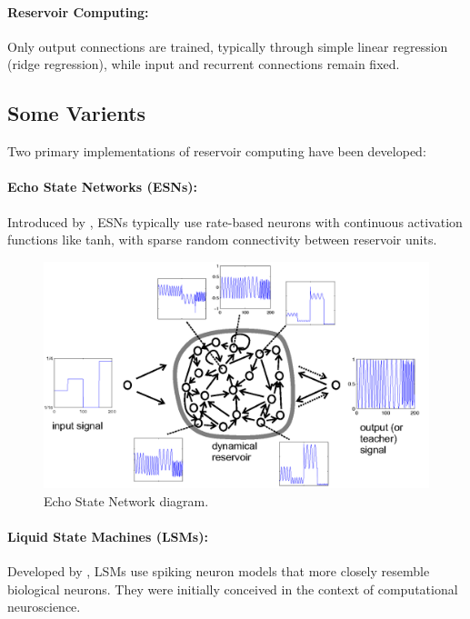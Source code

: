 \documentclass[numbered]{ivt-style/standard}
\begin{document}
\paragraph{Reservoir Computing:} Only output connections are trained, typically through simple linear regression (ridge regression), while input and recurrent connections remain fixed.

\subsection{Some Varients}

Two primary implementations of reservoir computing have been developed:

\paragraph{Echo State Networks (ESNs):} Introduced by \cite{article_esn_intro}, ESNs typically use rate-based neurons with continuous activation functions like tanh, with sparse random connectivity between reservoir units. 

\begin{figure}[H]
    \centering
    \includegraphics[width=1\linewidth]{figures/ESN_diag_FreqGenSchema.png}
    \caption{Echo State Network diagram. \cite{wiki:esn}}
    \label{fig:esn-diag}
\end{figure}
    
\paragraph{Liquid State Machines (LSMs):} Developed by \cite{article_lsm_intro}, LSMs use spiking neuron models that more closely resemble biological neurons. They were initially conceived in the context of computational neuroscience.
\end{document}
